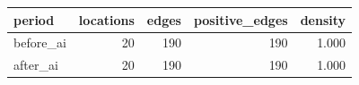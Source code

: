 \begin{tabular}{lrrrr}
\toprule
period & locations & edges & positive\_edges & density \\
\midrule
before\_ai & 20 & 190 & 190 & 1.000 \\
after\_ai & 20 & 190 & 190 & 1.000 \\
\bottomrule
\end{tabular}
